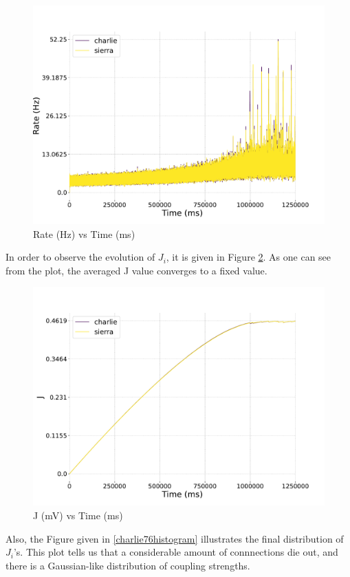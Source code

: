 \documentclass[a4paper,12pt]{article}
\begin{document}
\begin{figure}[htb!] 
    \centering
    \includegraphics[width=\linewidth]{nu_ext_76rate_over_time_homeostasis.pdf}
    \caption{Rate (Hz) vs Time (ms)}
    \label{charlie76ratevstime}
\end{figure}
In order to observe the evolution of $J_i$, it is given in Figure \ref{charlie76alphavstime}. As one can see from the plot, the averaged J value converges to a fixed value. 
\begin{figure}[htb!] 
    \centering
    \includegraphics[width=\linewidth]{nu_ext_76alpha_over_time_homeostasis.pdf}
    \caption{ J (mV) vs Time (ms)}
    \label{charlie76alphavstime}
\end{figure}
Also, the Figure given in \ref{charlie76histogram} illustrates the final distribution of $J_i$'s. This plot tells us that a considerable amount of connnections die out, and there is a Gaussian-like distribution of coupling strengths.
\end{document}
